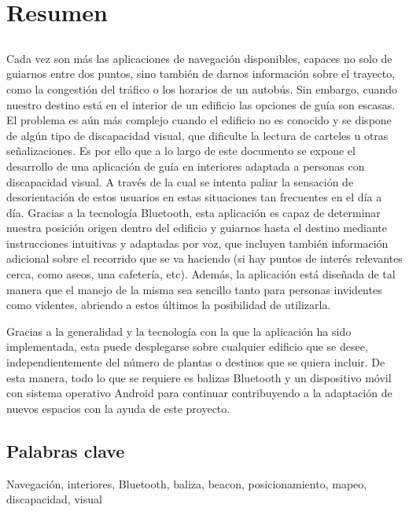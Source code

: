 \chapter*{Resumen}

\section*{\tituloPortadaVal}



Cada vez son más las aplicaciones de navegación disponibles, capaces no solo de guiarnos entre dos puntos, sino  también de darnos información sobre el trayecto, como la congestión del tráfico o los horarios de un autobús. Sin embargo, cuando nuestro destino está en el interior de un edificio las opciones de guía son escasas. El problema es aún más complejo cuando el edificio no es conocido y se dispone de algún tipo de discapacidad visual, que dificulte la lectura de carteles u otras señalizaciones. Es por ello que a lo largo de este documento se expone el desarrollo de una aplicación de guía en interiores adaptada a personas con discapacidad visual. A través de la cual se intenta paliar la sensación de desorientación de estos usuarios en estas situaciones tan frecuentes en el día a día. Gracias a la tecnología Bluetooth, esta aplicación es capaz de determinar nuestra posición origen dentro del edificio y guiarnos hasta el destino mediante instrucciones intuitivas y adaptadas por voz, que incluyen también información adicional sobre el recorrido que se va haciendo (si hay puntos de interés relevantes cerca, como aseos, una cafetería, etc). Además, la aplicación está diseñada de tal manera que el manejo de la misma sea sencillo tanto para personas invidentes como videntes, abriendo a estos últimos la posibilidad de utilizarla.


Gracias a la generalidad y la tecnología con la que la aplicación ha sido implementada, esta puede desplegarse sobre cualquier edificio que se desee, independientemente del número de plantas o destinos que se quiera incluir.  De esta manera, todo lo que se requiere es balizas Bluetooth y un dispositivo móvil con sistema operativo Android para continuar contribuyendo a la adaptación de nuevos espacios con la ayuda de este proyecto.

\section*{Palabras clave}
   
\noindent Navegación, interiores, Bluetooth, baliza, beacon, posicionamiento, mapeo, discapacidad, visual
   


